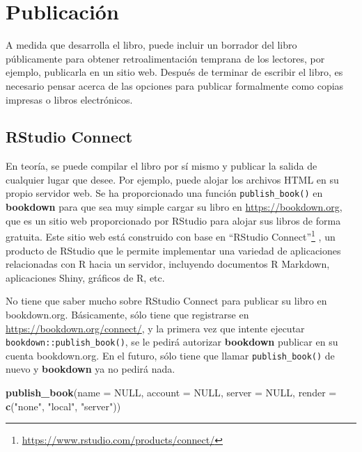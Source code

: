 \documentclass[12pt,]{krantz}
\makeatletter
\newenvironment{Shaded}{\begin{snugshade}}{\end{snugshade}}
\newcommand{\KeywordTok}[1]{\textcolor[rgb]{0.13,0.29,0.53}{\textbf{{#1}}}}
\newcommand{\DataTypeTok}[1]{\textcolor[rgb]{0.13,0.29,0.53}{{#1}}}
\newcommand{\StringTok}[1]{\textcolor[rgb]{0.31,0.60,0.02}{{#1}}}
\newcommand{\OtherTok}[1]{\textcolor[rgb]{0.56,0.35,0.01}{{#1}}}
\newcommand{\NormalTok}[1]{{#1}}
\renewcommand{\href}[2]{#2\footnote{\url{#1}}}
\newenvironment{kframe}{%
\medskip{}
\setlength{\fboxsep}{.8em}
 \def\at@end@of@kframe{}%
 \ifinner\ifhmode%
  \def\at@end@of@kframe{\end{minipage}}%
  \begin{minipage}{\columnwidth}%
 \fi\fi%
 \def\FrameCommand##1{\hskip\@totalleftmargin \hskip-\fboxsep
 \colorbox{shadecolor}{##1}\hskip-\fboxsep
     \hskip-\linewidth \hskip-\@totalleftmargin \hskip\columnwidth}%
 \MakeFramed {\advance\hsize-\width
   \@totalleftmargin\z@ \linewidth\hsize
   \@setminipage}}%
 {\par\unskip\endMakeFramed%
 \at@end@of@kframe}
\renewenvironment{Shaded}{\begin{kframe}}{\end{kframe}}
\theoremstyle{definition}
\theoremstyle{definition}
\theoremstyle{remark}
\makeatother
\begin{document}
\chapter{Publicación}\label{publicacion}

A medida que desarrolla el libro, puede incluir un borrador del libro
públicamente para obtener retroalimentación temprana de los lectores,
por ejemplo, publicarla en un sitio web. Después de terminar de escribir
el libro, es necesario pensar acerca de las opciones para publicar
formalmente como copias impresas o libros electrónicos.

\section{RStudio Connect}\label{rstudio-connect}

En teoría, se puede compilar el libro por sí mismo y publicar la salida
de cualquier lugar que desee. Por ejemplo, puede alojar los archivos
HTML en su propio servidor web. Se ha proporcionado una función
\texttt{publish\_book()} en \textbf{bookdown} para que sea muy simple
cargar su libro en \url{https://bookdown.org}, que es un sitio web
proporcionado por RStudio para alojar sus libros de forma gratuita.
 Este sitio web está construido con base en
\href{https://www.rstudio.com/products/connect/}{``RStudio Connect''}
, un producto de RStudio que le permite
implementar una variedad de aplicaciones relacionadas con R hacia un
servidor, incluyendo documentos R Markdown, aplicaciones Shiny, gráficos
de R, etc.

No tiene que saber mucho sobre RStudio Connect para publicar su libro en
bookdown.org. Básicamente, sólo tiene que registrarse en
\url{https://bookdown.org/connect/}, y la primera vez que intente
ejecutar
\texttt{bookdown::publish\_book()}, se
le pedirá autorizar \textbf{bookdown} publicar en su cuenta
bookdown.org. En el futuro, sólo tiene que llamar
\texttt{publish\_book()} de nuevo y \textbf{bookdown} ya no pedirá nada.

\begin{Shaded}
\begin{Highlighting}[]
\KeywordTok{publish_book}\NormalTok{(}\DataTypeTok{name =} \OtherTok{NULL}\NormalTok{, }\DataTypeTok{account =} \OtherTok{NULL}\NormalTok{, }\DataTypeTok{server =} \OtherTok{NULL}\NormalTok{, }
  \DataTypeTok{render =} \KeywordTok{c}\NormalTok{(}\StringTok{"none"}\NormalTok{, }\StringTok{"local"}\NormalTok{, }\StringTok{"server"}\NormalTok{))}
\end{Highlighting}
\end{Shaded}
\end{document}

